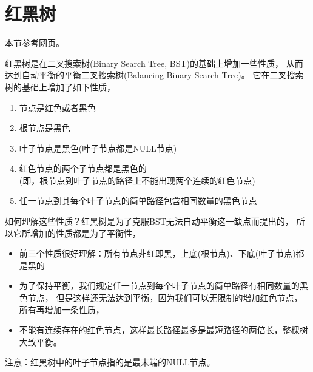 ﻿\section[红黑树]{红黑树}
本节参考\href{http://zh.wikipedia.org/wiki/红黑树}{网页}。

红黑树是在二叉搜索树(Binary Search Tree, BST)的基础上增加一些性质，
从而达到自动平衡的平衡二叉搜索树(Balancing Binary Search Tree)。
它在二叉搜索树的基础上增加了如下性质，
\begin{enumerate}
  \item 节点是红色或者黑色
  \item 根节点是黑色
  \item 叶子节点是黑色(叶子节点都是NULL节点)
  \item 红色节点的两个子节点都是黑色的\\
  (即，根节点到叶子节点的路径上不能出现两个连续的红色节点)
  \item 任一节点到其每个叶子节点的简单路径包含相同数量的黑色节点
\end{enumerate}
如何理解这些性质？红黑树是为了克服BST无法自动平衡这一缺点而提出的，
所以它所增加的性质都是为了平衡性，
\begin{itemize}
  \item 前三个性质很好理解：所有节点非红即黑，上底(根节点)、下底(叶子节点)都是黑的
  \item 为了保持平衡，我们规定任一节点到每个叶子节点的简单路径有相同数量的黑色节点，
  但是这样还无法达到平衡，因为我们可以无限制的增加红色节点，所有再增加一条性质，
  \item 不能有连续存在的红色节点，这样最长路径最多是最短路径的两倍长，整棵树大致平衡。
\end{itemize}
注意：红黑树中的叶子节点指的是最末端的NULL节点。

